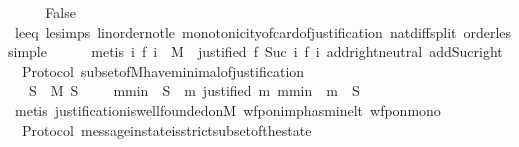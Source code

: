 \begin{isabellebody}
\ \ \isamarkupfalse%
\ \isamarkupfalse%
\ False\isanewline
\ \ \ \ \isamarkupfalse%
\ le{\isacharunderscore}{}{\isacharunderscore}eq\ le{\isacharunderscore}simps{\isacharparenleft}{}{\isacharparenright}\ linorder{\isacharunderscore}not{\isacharunderscore}le\ monotonicity{\isacharunderscore}of{\isacharunderscore}card{\isacharunderscore}of{\isacharunderscore}justification\ nat{\isacharunderscore}diff{\isacharunderscore}split\ order{\isacharunderscore}less{\isacharunderscore}imp{\isacharunderscore}le\isanewline
\ \ \ \ \isamarkupfalse%
\ {\isacharparenleft}metis\ {\isacartoucheopen}{\isasymforall}i{\isachardot}\ f\ i\ {\isasymin}\ M\ {\isasymand}\ justified\ {\isacharparenleft}f\ {\isacharparenleft}Suc\ i{\isacharparenright}{\isacharparenright}\ {\isacharparenleft}f\ i{\isacharparenright}{\isacartoucheclose}\ add{\isachardot}right{\isacharunderscore}neutral\ add{\isacharunderscore}Suc{\isacharunderscore}right{\isacharparenright}\isanewline
{}\isamarkupfalse%
%
\endisatagproof
{\isafoldproof}%
%
\isadelimproof
\isanewline
%
\endisadelimproof
\isanewline
{}\isamarkupfalse%
\ {\isacharparenleft}\ Protocol{\isacharparenright}\ subset{\isacharunderscore}of{\isacharunderscore}M{\isacharunderscore}have{\isacharunderscore}minimal{\isacharunderscore}of{\isacharunderscore}justification\ {\isacharcolon}\isanewline
\ \ {\isachardoublequoteopen}{\isasymforall}\ S\ {\isasymsubseteq}\ M{\isachardot}\ S\ {\isasymnoteq}\ {\isasymemptyset}\ {\isasymlongrightarrow}\ {\isacharparenleft}{\isasymexists}\ m{\isacharunderscore}min\ {\isasymin}\ S{\isachardot}\ {\isasymforall}\ m{\isachardot}\ justified\ m\ m{\isacharunderscore}min\ {\isasymlongrightarrow}\ m\ {\isasymnotin}\ S{\isacharparenright}{\isachardoublequoteclose}\isanewline
%
\isadelimproof
\ \ %
\endisadelimproof
%
\isatagproof
{}\isamarkupfalse%
\ {\isacharparenleft}metis\ justification{\isacharunderscore}is{\isacharunderscore}well{\isacharunderscore}founded{\isacharunderscore}on{\isacharunderscore}M\ wfp{\isacharunderscore}on{\isacharunderscore}imp{\isacharunderscore}has{\isacharunderscore}min{\isacharunderscore}elt\ wfp{\isacharunderscore}on{\isacharunderscore}mono{\isacharparenright}%
\endisatagproof
{\isafoldproof}%
%
\isadelimproof
\isanewline
%
\endisadelimproof
\isanewline
{}\isamarkupfalse%
\ {\isacharparenleft}\ Protocol{\isacharparenright}\ message{\isacharunderscore}in{\isacharunderscore}state{\isacharunderscore}is{\isacharunderscore}strict{\isacharunderscore}subset{\isacharunderscore}of{\isacharunderscore}the{\isacharunderscore}state\ {\isacharcolon}\isanewline

\end{isabellebody}
